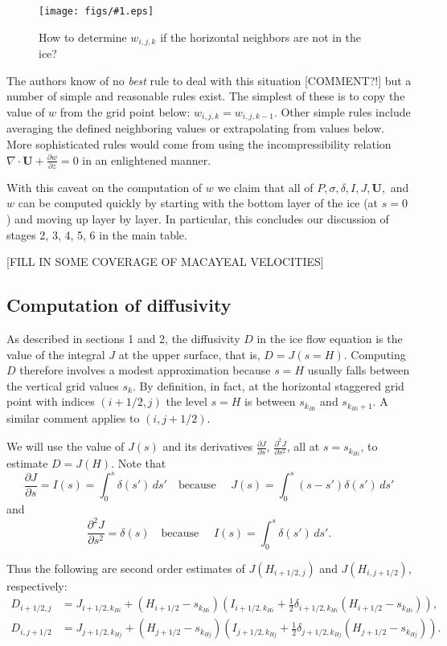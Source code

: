 \documentclass[12pt,final]{amsart}%
\theoremstyle{plain}
\theoremstyle{definition}
\theoremstyle{remark}
\newcommand{\regfigure}[2]{\texttt{[image: figs/\#1.eps]}}
\newcommand{\ddz}[1]{\ensuremath{\frac{\partial #1}{\partial z}}}
\newcommand{\dds}[1]{\ensuremath{\frac{\partial #1}{\partial s}}}
\newcommand{\dddsds}[1]{\ensuremath{\frac{\partial^2 #1}{\partial s^2}}}
\newcommand{\diverg}{\nabla\cdot}
\newcommand{\bU}{{\mathbf{U}}}
\begin{document}
\begin{figure}[ht]
\vspace{-4mm}
\regfigure{bdrywsitfig}{2.5}
\vspace{-6mm}
\caption{How to determine $w_{i,j,k}$ if the horizontal neighbors are not in the ice?}
\label{bdrywsit}
\end{figure}

The authors know of no \emph{best} rule to deal with this situation [COMMENT?!] but a number of simple and reasonable rules exist.  The simplest of these is to copy the value of $w$ from the grid point below: $w_{i,j,k}=w_{i,j,k-1}$.  Other simple rules include averaging the defined neighboring values or extrapolating from values below.  More sophisticated rules would come from using the incompressibility relation $\diverg \bU+\ddz{w}=0$ in an enlightened manner.

With this caveat on the computation of $w$ we claim that all of $P, \sigma, \delta, I, J, \bU,$ and $w$ can be computed quickly by starting with the bottom layer of the ice (at $s=0$) and moving up layer by layer.  In particular, this concludes our discussion of stages 2, 3, 4, 5, 6 in the main table.

[FILL IN SOME COVERAGE OF MACAYEAL VELOCITIES]

\subsection*{Computation of diffusivity}  As described in sections 1 and 2, the diffusivity $D$ in the ice flow equation is the value of the integral $J$ at the upper surface, that is, $D=J(s=H)$.  Computing $D$ therefore involves a modest approximation because $s=H$ usually falls between the vertical grid values $s_k$.  By definition, in fact, at the horizontal staggered grid point with indices $(i+1/2,j)$ the level $s=H$ is between $s_{k_{Hi}}$ and $s_{k_{Hi}+1}$.  A similar comment applies to $(i,j+1/2)$.

We will use the value of $J(s)$ and its derivatives $\dds{J}$, $\dddsds{J}$, all at $s=s_{k_{Hi}}$, to estimate $D=J(H)$.  Note that
    $$\dds{J} = I(s) = \int_0^s \delta(s')\,ds' \quad \text{because } \quad J(s) = \int_0^s (s-s') \delta(s')\,ds'$$
and
    $$\dddsds{J}=\delta(s) \quad \text{because } \quad I(s) = \int_0^s \delta(s')\,ds'.$$

Thus the following are second order estimates of $J(H_{i+1/2,j})$ and $J(H_{i,j+1/2})$, respectively:
\begin{align}
D_{i+1/2,j}&=J_{i+1/2,k_{Hi}} + (H_{i+1/2}-s_{k_{Hi}}) \left(I_{i+1/2,k_{Hi}} + \frac{1}{2} \delta_{i+1/2,k_{Hi}} (H_{i+1/2}-s_{k_{Hi}})\right), \\
D_{i,j+1/2}&=J_{j+1/2,k_{Hj}} + (H_{j+1/2}-s_{k_{Hj}}) \left(I_{j+1/2,k_{Hj}} + \frac{1}{2} \delta_{j+1/2,k_{Hj}} (H_{j+1/2}-s_{k_{Hj}})\right).
\end{align}
\end{document}
